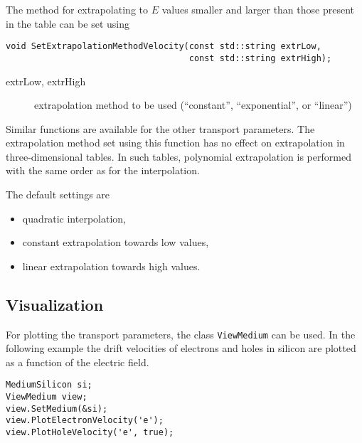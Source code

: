 The method for extrapolating to \(E\) values smaller and larger 
than those present in the table can be set using 
\begin{lstlisting}
void SetExtrapolationMethodVelocity(const std::string extrLow,
                                    const std::string extrHigh);
\end{lstlisting}
\begin{description}
\item[extrLow, extrHigh] extrapolation method to be used 
(``constant'', ``exponential'', or ``linear'')
\end{description}
Similar functions are available for the other transport parameters. 
The extrapolation method set using this function has no effect on 
extrapolation in three-dimensional tables. 
In such tables, polynomial extrapolation is performed with the same 
order as for the interpolation.

The default settings are
\begin{itemize}
  \item
  quadratic interpolation,
  \item
  constant extrapolation towards low values,
  \item
  linear extrapolation towards high values.
\end{itemize}

\subsection{Visualization}
For plotting the transport parameters, the class
\texttt{ViewMedium} can be used. In the following example the 
drift velocities of electrons and holes in silicon are plotted as a 
function of the electric field.
\begin{lstlisting}
MediumSilicon si;
ViewMedium view;
view.SetMedium(&si);
view.PlotElectronVelocity('e');
view.PlotHoleVelocity('e', true);
\end{lstlisting}

